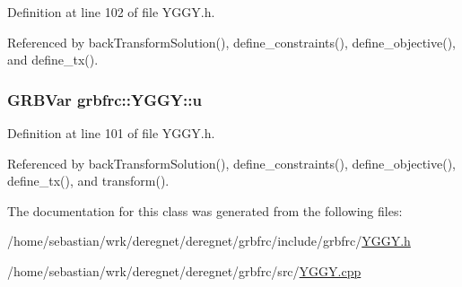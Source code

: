 Definition at line 102 of file Y\+G\+G\+Y.\+h.



Referenced by back\+Transform\+Solution(), define\+\_\+constraints(), define\+\_\+objective(), and define\+\_\+tx().

\subsubsection[{\texorpdfstring{u}{u}}]{\setlength{\rightskip}{0pt plus 5cm}G\+R\+B\+Var grbfrc\+::\+Y\+G\+G\+Y\+::u\hspace{0.3cm}{\ttfamily [private]}}\hypertarget{classgrbfrc_1_1YGGY_a1c24782afe02686a8eabc59b829cdec0}{}\label{classgrbfrc_1_1YGGY_a1c24782afe02686a8eabc59b829cdec0}


Definition at line 101 of file Y\+G\+G\+Y.\+h.



Referenced by back\+Transform\+Solution(), define\+\_\+constraints(), define\+\_\+objective(), define\+\_\+tx(), and transform().



The documentation for this class was generated from the following files\+:\begin{DoxyCompactItemize}
\item 
/home/sebastian/wrk/deregnet/deregnet/grbfrc/include/grbfrc/\hyperlink{YGGY_8h}{Y\+G\+G\+Y.\+h}\item 
/home/sebastian/wrk/deregnet/deregnet/grbfrc/src/\hyperlink{YGGY_8cpp}{Y\+G\+G\+Y.\+cpp}\end{DoxyCompactItemize}
